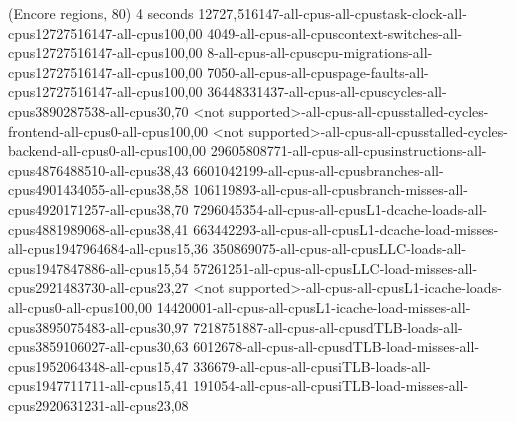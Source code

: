 (Encore regions, 80)
4 seconds
12727,516147-all-cpus-all-cpustask-clock-all-cpus12727516147-all-cpus100,00
4049-all-cpus-all-cpuscontext-switches-all-cpus12727516147-all-cpus100,00
8-all-cpus-all-cpuscpu-migrations-all-cpus12727516147-all-cpus100,00
7050-all-cpus-all-cpuspage-faults-all-cpus12727516147-all-cpus100,00
36448331437-all-cpus-all-cpuscycles-all-cpus3890287538-all-cpus30,70
<not supported>-all-cpus-all-cpusstalled-cycles-frontend-all-cpus0-all-cpus100,00
<not supported>-all-cpus-all-cpusstalled-cycles-backend-all-cpus0-all-cpus100,00
29605808771-all-cpus-all-cpusinstructions-all-cpus4876488510-all-cpus38,43
6601042199-all-cpus-all-cpusbranches-all-cpus4901434055-all-cpus38,58
106119893-all-cpus-all-cpusbranch-misses-all-cpus4920171257-all-cpus38,70
7296045354-all-cpus-all-cpusL1-dcache-loads-all-cpus4881989068-all-cpus38,41
663442293-all-cpus-all-cpusL1-dcache-load-misses-all-cpus1947964684-all-cpus15,36
350869075-all-cpus-all-cpusLLC-loads-all-cpus1947847886-all-cpus15,54
57261251-all-cpus-all-cpusLLC-load-misses-all-cpus2921483730-all-cpus23,27
<not supported>-all-cpus-all-cpusL1-icache-loads-all-cpus0-all-cpus100,00
14420001-all-cpus-all-cpusL1-icache-load-misses-all-cpus3895075483-all-cpus30,97
7218751887-all-cpus-all-cpusdTLB-loads-all-cpus3859106027-all-cpus30,63
6012678-all-cpus-all-cpusdTLB-load-misses-all-cpus1952064348-all-cpus15,47
336679-all-cpus-all-cpusiTLB-loads-all-cpus1947711711-all-cpus15,41
191054-all-cpus-all-cpusiTLB-load-misses-all-cpus2920631231-all-cpus23,08
